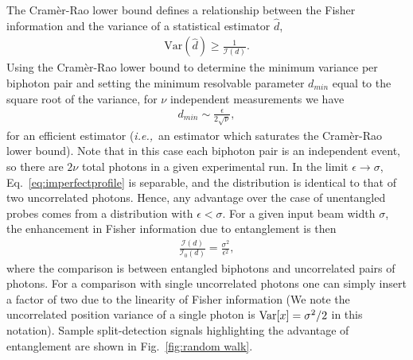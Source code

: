 The Cram\`{e}r-Rao lower bound \cite{Larsen2001} defines a relationship between the Fisher information and the variance of a statistical estimator $\hat{d}$,
\begin{align}
\text{Var}(\hat{d}) \ge \frac{1}{\mathcal{I}(d)}.
\end{align}
Using the Cram\`{e}r-Rao lower bound to determine the minimum variance per biphoton pair and setting the minimum resolvable parameter $d_{min}$ equal to the square root of the variance, for $\nu$ independent measurements we have 
\begin{align}\label{eq:efficientdmin}
	d_{min} \sim \frac{\epsilon}{2\sqrt{\nu}},
\end{align}
for an efficient estimator (\emph{i.e.,}~an estimator which saturates the Cram\`{e}r-Rao lower bound).
Note that in this case each biphoton pair is an independent event, so there are $2\nu$ total photons in a given experimental run.
In the limit $\epsilon \rightarrow \sigma$, Eq.~\eqref{eq:imperfectprofile} is separable, and the distribution is identical to that of two uncorrelated photons.  
Hence, any advantage over the case of unentangled probes comes from a distribution with $\epsilon < \sigma$.
For a given input beam width $\sigma$, the enhancement in Fisher information due to entanglement is then
\begin{align}\label{eq:fisherratio}
	\frac{\mathcal{I}(d)}{\mathcal{I}_0(d)} = \frac{\sigma^2}{\epsilon^2}, 
\end{align}
where the comparison is between entangled biphotons and uncorrelated pairs of photons.  
For a comparison with single uncorrelated photons one can simply insert a factor of two due to the linearity of Fisher information (We note the uncorrelated position variance of a single photon is ${\rm Var}[x] = \sigma^2/2$ in this notation).
Sample split-detection signals highlighting the advantage of entanglement are shown in Fig.~\ref{fig:random walk}. 

